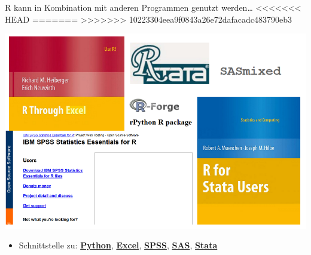 \documentclass[ignorenonframetext,]{beamer}
\providecommand{\tightlist}{%
  \setlength{\itemsep}{0pt}\setlength{\parskip}{0pt}}
\begin{document}
\begin{frame}{R kann in Kombination mit anderen Programmen genutzt
werden\ldots{}}
<<<<<<< HEAD
=======
\protect\hypertarget{r-kann-in-kombination-mit-anderen-programmen-genutzt-werden}{}
>>>>>>> 10223304eea9f0843a26e72dafacadc483790eb3

\includegraphics{figure/Rinterfaces.PNG}

\begin{itemize}
\tightlist
\item
  Schnittstelle zu:
  \href{https://cran.r-project.org/web/packages/reticulate/vignettes/calling_python.html}{\textbf{Python}},
  \href{https://www.springer.com/de/book/9781441900517}{\textbf{Excel}},
  \href{https://www.ibm.com/support/knowledgecenter/en/SSFUEU_7.2.0/com.ibm.swg.ba.cognos.op_capmod_ig.7.2.0.doc/t_essentials_for_r_statistics.html}{\textbf{SPSS}},
  \href{https://cran.r-project.org/web/packages/SASmixed/index.html}{\textbf{SAS}},
  \href{https://cran.r-project.org/web/packages/RStata/index.html}{\textbf{Stata}}
\end{itemize}

\end{frame}
\end{document}
